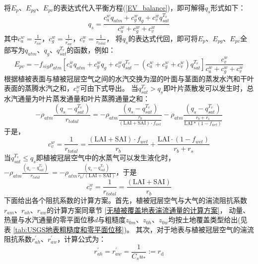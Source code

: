 将$E_p$、$E_{pg}$、$E_{pv}$的表达式代入平衡方程(\ref{EV_balance})，即可解得$q_s$形式如下：
\begin{equation}
q_{s}=\frac{c_{a}^{w} q_{atm}+c_{g}^{w} q_{g}+c_{v}^{w} q_{s a t}^{T_{v}}}{c_{a}^{w}+c_{g}^{w}+c_{v}^{w}}
\end{equation}
其中$c_a^w=\frac{1}{r_{aw}}$，$c_g^w=\frac{1}{r_{aw}^\prime}$，$c_v^w=\frac{1}{r_{total}}$，
将$q_s$的表达式代回，即可将$E_p$、$E_{pg}$、$E_{pv}$全部写为$q_{atm}$、$q_g$、$q_{sat}^{T_v}$的函数，例如：
\begin{equation}
E_{p v}=-f_{sig} \rho_{atm}\left[c_{a}^{w} q_{atm}+c_{g}^{w} q_{g}+c_{v}^{w} q_{s a t}^{T_{v}}-
\left(c_{a}^{w}+c_{g}^{w}+c_{v}^{w}\right) q_{s a t}^{T_{v}}\right] \frac{c_{v}^{w}}{c_{a}^{w}+c_{g}^{w}+c_{v}^{w}}
\end{equation}
根据植被表面与植被冠层空气之间的水汽交换为湿的叶面与茎面的蒸发水汽和干叶表面的蒸腾水汽之和，$c_v^w$可由下式导出。
当$q_{sat}^{T_v}>q_s$即叶片蒸散发可以发生时，总水汽通量为叶片蒸发通量和叶片蒸腾通量之和：
\begin{equation}
-\rho_{atm} \frac{\left(q_{s}-q_{s a t}^{T_{v}}\right)}{r_{{total }}}=-\rho_{atm} 
\frac{\left(q_{s}-q_{s a t}^{T_{v}}\right)}{\frac{r_{b}}{(\text {LAI}+\text {SAI}) \cdot f_{{wet }}}}-\rho_{atm} \frac{\left(q_{s}-q_{s a t}^{T_{v}}\right)}{\frac{r_{b}+r_{s}}{\text {LAI} *\left(1-f_{{wet }}\right)}}
\end{equation}
于是，
\begin{equation}
c_{v}^{w}=\frac{1}{r_{{total }}}=\frac{(\text {LAI}+\text {SAI}) \cdot f_{{wet }}}{r_{b}}+\frac{\text {LAI} \cdot \left(1-f_{{wet}}\right)}{r_{b}+r_{s}}
\end{equation}
当$q_{sat}^{T_v}\le q_s$即植被冠层空气中的水蒸气可以发生液化时，
$-\rho_{atm}\frac{\left(q_s-q_{sat}^{T_v}\right)}{r_{total}}\ =-\rho_{atm}\frac{\left(q_s-q_{sat}^{T_v}\right)}{r_b/\left(\text {LAI}+\text {SAI}\right)}$，于是
\begin{equation}
c_{v}^{w}=\frac{1}{r_{{total }}}=\frac{(\text {LAI}+\text {SAI})}{r_{b}}
\end{equation}
下面给出各个阻抗系数的计算方案。首先，植被冠层空气与大气的湍流阻抗系数$r_{am}$、$r_{ah}$、$r_{aw}$的计算方案同章节 \ref{无植被覆盖地表湍流通量的计算方案}，
动量、热量与水汽通量的零平面位移$d$与粗糙度$z_{0m}$、$z_{0h}$、$z_{0w}$均按土地覆盖类型给出(见
表 \ref{tab:USGS地表粗糙度和零平面位移})。
其次，对于地表与植被冠层空气的湍流阻抗系数$r_{ah}^\prime$、$r_{aw}^\prime$，计算公式为：
\begin{equation}
r_{a h}^{\prime}=r_{a w}^{\prime}=\frac{1}{C_{s} u_{*}}:=r_{\mathrm{d}}
\end{equation}
